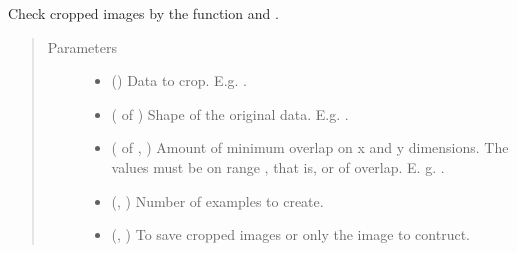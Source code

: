 \documentclass[letterpaper,10pt,english]{sphinxmanual}
\begin{document}
\begin{fulllineitems}
\label{\detokenize{data/data_2d_manipulation:data.data_2D_manipulation.check_crops}}
Check cropped images by the function  and
{\hyperref[\detokenize{data/data_2d_manipulation:data.data_2D_manipulation.crop_data_with_overlap}]{}}.
\begin{quote}\begin{description}
\item[{Parameters}] \leavevmode\begin{itemize}
\item {} 
 () \textendash{} Data to crop. E.g. .

\item {} 
 ( of ) \textendash{} Shape of the original data. E.g. .

\item {} 
 ( of , ) \textendash{} Amount of minimum overlap on x and y dimensions. The values must be on range \sphinxcode{\sphinxupquote{{[}0, 1)}}, that is,  or
 of overlap. E. g. .

\item {} 
 (, ) \textendash{} Number of examples to create.

\item {} 
 (, ) \textendash{} To save cropped images or only the image to contruct.


\end{itemize}
\end{description}
\end{quote}
\end{fulllineitems}
\end{document}
